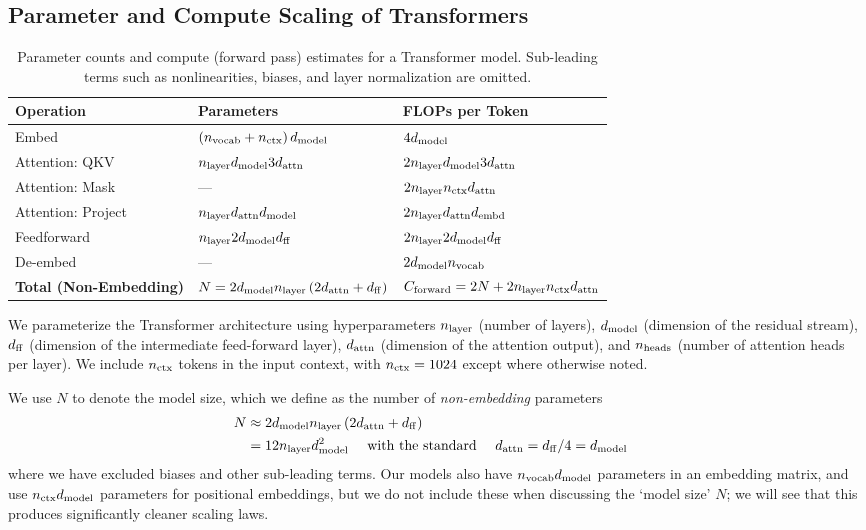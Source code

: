 \documentclass[english]{article}
\begin{document}
\subsection{Parameter and Compute Scaling of Transformers}
\label{sec:ParameterComputeCounts}


\begin{table}[t!]
\centering
\begin{tabular}{|l|l|l|}
\hline 
\textbf{Operation}  & \textbf{Parameters}  & \textbf{FLOPs per Token}\tabularnewline
\hline 
\hline 
Embed  & $\left(n_{{\rm vocab}} + n_{{\rm ctx}}\right)d_{{\rm model}}$  & $4d_{{\rm model}}$\tabularnewline
\hline 
Attention: QKV  & $n_{{\rm layer}}d_{{\rm model}}3d_{{\rm attn}}$  & $2n_{{\rm layer}}d_{{\rm model}}3d_{{\rm attn}}$\tabularnewline
\hline 
Attention: Mask & ---  & $2n_{{\rm layer}}n_{{\rm ctx}}d_{{\rm attn}}$\tabularnewline
\hline 
Attention: Project & $n_{{\rm layer}}d_{{\rm attn}}d_{{\rm model}}$  & $2n_{{\rm layer}}d_{{\rm attn}}d_{{\rm embd}}$\tabularnewline
\hline 
Feedforward  & $n_{{\rm layer}}2d_{{\rm model}}d_{{\rm ff}}$ & $2n_{{\rm layer}}2d_{{\rm model}}d_{{\rm ff}}$\tabularnewline
\hline 
De-embed  & ---  & $2d_{{\rm model}}n_{{\rm vocab}}$\tabularnewline
\hline 
\hline 
\textbf{Total (Non-Embedding)} & $N=2d_{{\rm model}}n_{{\rm layer}}\left(2d_{{\rm attn}}+d_{{\rm ff}}\right)$  & $C_{\mathrm{forward}}=2N+2n_{{\rm layer}}n_{{\rm ctx}}d_{{\rm attn}}$\tabularnewline
\hline 
\end{tabular}
\vspace{1em}
\caption[Parameter and compute counts for Transformer]{Parameter counts and compute (forward pass) estimates for a Transformer model.  Sub-leading terms such as nonlinearities, biases, and layer normalization are omitted. \label{tab:TableTransformerParamsFLOPs}}
\end{table}

 We parameterize the Transformer architecture using hyperparameters $n_{\rm layer}$ (number of layers), $d_{{\rm model}}$ (dimension of the residual stream), $d_{\rm ff}$ (dimension of the intermediate feed-forward layer), $d_{\rm attn}$ (dimension of the attention output), and $n_{\rm heads}$ (number of attention heads per layer).  We include $n_{\rm ctx}$ tokens in the input context, with $n_{\rm ctx} = 1024$ except where otherwise noted.

We use $N$ to denote the model size, which we define as the number of \emph{non-embedding} parameters
\begin{align}
\label{eq:ModelSizeDefinition}
N & \approx  2d_{{\rm model}}n_{{\rm layer}}\left(2d_{{\rm attn}}+d_{{\rm ff}}\right) & \nonumber \\
& = 12 n_{\rm layer} d_{{\rm model}}^2 \quad \text{ with the standard } \quad d_{\rm attn} = d_{\rm ff}/4 = d_{{\rm model}} &
\end{align}
where we have excluded biases and other sub-leading terms.
Our models also have $n_{\rm vocab} d_{{\rm model}}$ parameters in an embedding matrix, and use $n_{\rm ctx} d_{{\rm model}}$ parameters for positional embeddings, but we do not include these when discussing the `model size' $N$; we will see that this produces significantly cleaner scaling laws.
\end{document}
